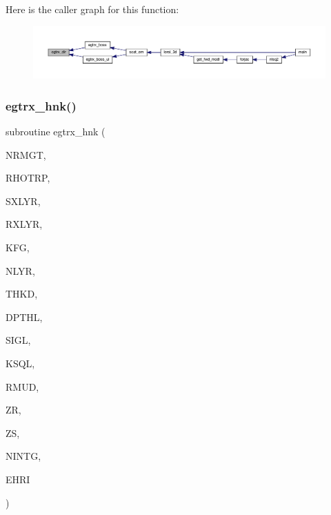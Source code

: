 Here is the caller graph for this function\+:\nopagebreak
\begin{figure}[H]
\begin{center}
\leavevmode
\includegraphics[width=350pt]{Leroi_8f90_a6bbebe0c58cc288fcd56628de8860916_icgraph}
\end{center}
\end{figure}
\mbox{\label{Leroi_8f90_a5489646b1d19d3a2a814c56265bd78fb}} 
\subsubsection{\texorpdfstring{egtrx\+\_\+hnk()}{egtrx\_hnk()}}
{\footnotesize\ttfamily subroutine egtrx\+\_\+hnk (\begin{DoxyParamCaption}\item[{integer}]{N\+R\+M\+GT,  }\item[{real, dimension(nrmgt)}]{R\+H\+O\+T\+RP,  }\item[{integer}]{S\+X\+L\+YR,  }\item[{integer}]{R\+X\+L\+YR,  }\item[{integer}]{K\+FG,  }\item[{integer}]{N\+L\+YR,  }\item[{real (kind=ql), dimension(nlyr)}]{T\+H\+KD,  }\item[{real (kind=ql), dimension(nlyr)}]{D\+P\+T\+HL,  }\item[{complex(kind=ql), dimension(nlyr)}]{S\+I\+GL,  }\item[{complex(kind=ql), dimension(nlyr)}]{K\+S\+QL,  }\item[{real (kind=ql), dimension(0\+:nlyr)}]{R\+M\+UD,  }\item[{real (kind=ql)}]{ZR,  }\item[{real (kind=ql)}]{ZS,  }\item[{integer}]{N\+I\+N\+TG,  }\item[{complex (kind=ql), dimension(nrmgt,6)}]{E\+H\+RI }\end{DoxyParamCaption})}

